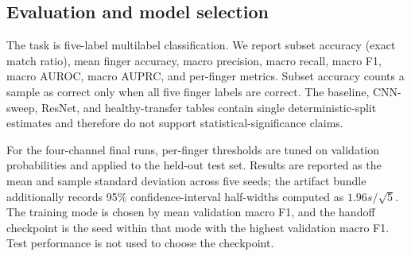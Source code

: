 \subsection{Evaluation and model selection}

The task is five-label multilabel classification. We report subset accuracy (exact match ratio), mean finger accuracy, macro precision, macro recall, macro F1, macro AUROC, macro AUPRC, and per-finger metrics. Subset accuracy counts a sample as correct only when all five finger labels are correct. The baseline, CNN-sweep, ResNet, and healthy-transfer tables contain single deterministic-split estimates and therefore do not support statistical-significance claims.

For the four-channel final runs, per-finger thresholds are tuned on validation probabilities and applied to the held-out test set. Results are reported as the mean and sample standard deviation across five seeds; the artifact bundle additionally records 95\% confidence-interval half-widths computed as $1.96s/\sqrt{5}$. The training mode is chosen by mean validation macro F1, and the handoff checkpoint is the seed within that mode with the highest validation macro F1. Test performance is not used to choose the checkpoint.
